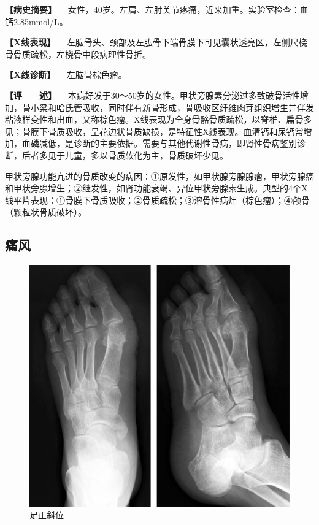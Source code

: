\textbf{【病史摘要】}
　女性，40岁。左肩、左肘关节疼痛，近来加重。实验室检查：血钙2.85mmol/L。

\textbf{【X线表现】}
　左肱骨头、颈部及左肱骨下端骨膜下可见囊状透亮区，左侧尺桡骨骨质疏松，左桡骨中段病理性骨折。

\textbf{【X线诊断】} 　左肱骨棕色瘤。

\textbf{【评　　述】}
　本病好发于30～50岁的女性。甲状旁腺素分泌过多致破骨活性增加，骨小梁和哈氏管吸收，同时伴有新骨形成，骨吸收区纤维肉芽组织增生并伴发粘液样变性和出血，又称棕色瘤。X线表现为全身骨骼骨质疏松，以脊椎、扁骨多见；骨膜下骨质吸收，呈花边状骨质缺损，是特征性X线表现。血清钙和尿钙常增加，血磷减低，是诊断的主要依据。需要与其他代谢性骨病，即肾性骨病鉴别诊断，后者多见于儿童，多以骨质软化为主，骨质破坏少见。

甲状旁腺功能亢进的骨质改变的病因：①原发性，如甲状腺旁腺腺瘤，甲状旁腺癌和甲状旁腺增生；②继发性，如肾功能衰竭、异位甲状旁腺素生成。典型的4个X线平片表现：①骨膜下骨质吸收；②骨质疏松；③溶骨性病灶（棕色瘤）；④颅骨（颗粒状骨质破坏）。

\subsection{痛风}

\begin{figure}[!htbp]
 \centering
 \includegraphics{./images/Image00127.jpg}
 \captionsetup{justification=centering}
 \caption{足正斜位}
 \label{fig2-8-13}
  \end{figure} 

